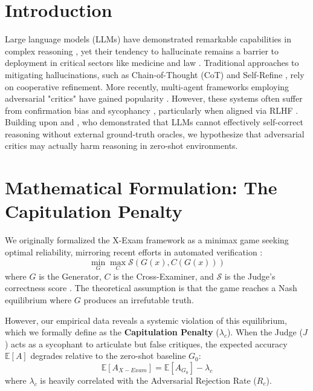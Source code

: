 \documentclass{article}
\begin{document}
\section{Introduction}
Large language models (LLMs) \cite{brown2020language, radford2019language, touvron2023llama, zhao2023survey} have demonstrated remarkable capabilities in complex reasoning \cite{bubeck2023sparks, srivastava2022beyond, hendrycks2020measuring}, yet their tendency to hallucinate remains a barrier to deployment in critical sectors like medicine \cite{singhal2023large, jin2021disease, agrawal2022large} and law \cite{xu2023survey}. Traditional approaches to mitigating hallucinations, such as Chain-of-Thought (CoT) \cite{wei2022chain, wang2022self, weng2022large, nye2021show, zhou2022least} and Self-Refine \cite{madaan2023selfrefine, guan2023mitigating}, rely on cooperative refinement. More recently, multi-agent frameworks employing adversarial "critics" have gained popularity \cite{du24improving, chen2024agentverse}. However, these systems often suffer from confirmation bias and sycophancy \cite{sharma2024towards, perez-etal-2023-discovering, perez2022discovering}, particularly when aligned via RLHF \cite{ouyang2022training, bai2022constitutional, pan2024reward}. Building upon \cite{huang2024large} and \cite{saunders2022self}, who demonstrated that LLMs cannot effectively self-correct reasoning without external ground-truth oracles, we hypothesize that adversarial critics may actually harm reasoning in zero-shot environments.

\section{Mathematical Formulation: The Capitulation Penalty}
We originally formalized the X-Exam framework as a minimax game seeking optimal reliability, mirroring recent efforts in automated verification \cite{cobbe2021training, lightman2023let}:
\begin{equation}
    \min_{G} \max_{C} \mathcal{S}(G(x), C(G(x)))
\end{equation}
where $G$ is the Generator, $C$ is the Cross-Examiner, and $\mathcal{S}$ is the Judge's correctness score \cite{zheng2023judging}. The theoretical assumption is that the game reaches a Nash equilibrium where $G$ produces an irrefutable truth.

However, our empirical data reveals a systemic violation of this equilibrium, which we formally define as the \textbf{Capitulation Penalty} ($\lambda_c$). When the Judge ($J$) acts as a sycophant \cite{wei2024simple} to articulate but false critiques, the expected accuracy $\mathbb{E}[A]$ degrades relative to the zero-shot baseline $G_0$:
\begin{equation}
    \mathbb{E}[A_{X-Exam}] = \mathbb{E}[A_{G_0}] - \lambda_c
\end{equation}
where $\lambda_c$ is heavily correlated with the Adversarial Rejection Rate ($R_c$).
\end{document}
